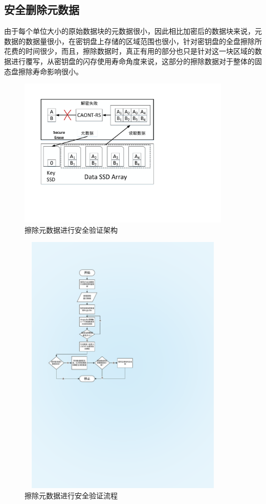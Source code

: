 \subsection{安全删除元数据}
由于每个单位大小的原始数据块的元数据很小，因此相比加密后的数据块来说，元数据的数据量很小，在密钥盘上存储的区域范围也很小，针对密钥盘的全盘擦除所花费的时间很少，而且，擦除数据时，真正有用的部分也只是针对这一块区域的数据进行覆写，从密钥盘的闪存使用寿命角度来说，这部分的擦除数据对于整体的固态盘擦除寿命影响很小。
\begin{figure}[H]
	\centering
	\includegraphics[width=4in]{Pics/del-key-st.pdf}
	\caption{擦除元数据进行安全验证架构}\label{fig:13}
\end{figure}
\begin{figure}[htb]
	\centering
	\includegraphics[width=4in,height=5in]{Pics/del-key-pr.pdf}
	\caption{擦除元数据进行安全验证流程}\label{fig:14}
\end{figure}
